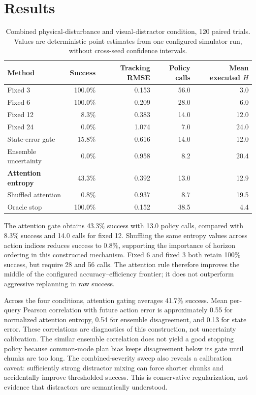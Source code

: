 \documentclass[11pt]{article}
\begin{document}
\section{Results}
\begin{table}[H]
\centering
\small
\begin{tabular}{lrrrr}
\toprule
Method & Success & Tracking RMSE & Policy calls & Mean executed $H$ \\
\midrule
Fixed 3 & 100.0\% & 0.153 & 56.0 & 3.0 \\
Fixed 6 & 100.0\% & 0.209 & 28.0 & 6.0 \\
Fixed 12 & 8.3\% & 0.383 & 14.0 & 12.0 \\
Fixed 24 & 0.0\% & 1.074 & 7.0 & 24.0 \\
State-error gate & 15.8\% & 0.616 & 14.0 & 12.0 \\
Ensemble uncertainty & 0.0\% & 0.958 & 8.2 & 20.4 \\
\textbf{Attention entropy} & 43.3\% & 0.392 & 13.0 & 12.9 \\
Shuffled attention & 0.8\% & 0.937 & 8.7 & 19.5 \\
Oracle stop & 100.0\% & 0.152 & 38.5 & 4.4 \\
\bottomrule
\end{tabular}
\caption{Combined physical-disturbance and visual-distractor condition, 120 paired trials. Values are deterministic point estimates from one configured simulator run, without cross-seed confidence intervals.}
\end{table}

The attention gate obtains 43.3\% success with 13.0 policy calls, compared with 8.3\% success and 14.0 calls for fixed 12. Shuffling the same entropy values across action indices reduces success to 0.8\%, supporting the importance of horizon ordering in this constructed mechanism. Fixed 6 and fixed 3 both retain 100\% success, but require 28 and 56 calls. The attention rule therefore improves the middle of the configured accuracy--efficiency frontier; it does not outperform aggressive replanning in raw success.

Across the four conditions, attention gating averages 41.7\% success. Mean per-query Pearson correlation with future action error is approximately 0.55 for normalized attention entropy, 0.54 for ensemble disagreement, and 0.13 for state error. These correlations are diagnostics of this construction, not uncertainty calibration. The similar ensemble correlation does not yield a good stopping policy because common-mode plan bias keeps disagreement below its gate until chunks are too long. The combined-severity sweep also reveals a calibration caveat: sufficiently strong distractor mixing can force shorter chunks and accidentally improve thresholded success. This is conservative regularization, not evidence that distractors are semantically understood.
\end{document}
